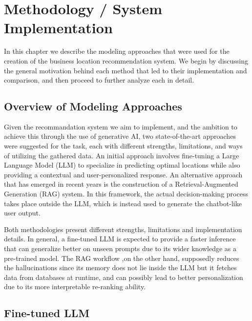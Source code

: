 \chapter{Methodology / System Implementation}
\label{chap4}


In this chapter we describe the modeling approaches that were used for the creation of the business location recommendation system. We begin by discussing the general motivation behind each method that led to their implementation and comparison, and then proceed to further analyze each in detail.


\section{Overview of Modeling Approaches}

Given the recommandation system we aim to implement, and the ambition to achieve this through the use of generative AI, two state-of-the-art approaches were suggested for the task, each with different strengths, limitations, and ways of utilizing the gathered data. An initial approach involves fine-tuning a Large Language Model (LLM) to specialize in predicting optimal locations while also providing a contextual and user-personalized response. An alternative approach that has emerged in recent years is the construction of a Retrieval-Augmented Generation (RAG) system. In this framework, the actual decision-making process takes place outside the LLM, which is instead used to generate the chatbot-like user output.

Both methodologies present different strengths, limitations and implementation details. In general, a fine-tuned LLM is expected to provide a faster inference that can generalize better on unseen prompts due to its wider knowledge as a pre-trained model. The RAG workflow ,on the other hand, supposedly reduces the hallucinations since its memory does not lie inside the LLM but it fetches data from databases at runtime, and can possibly lead to better personalization due to its more interpretable re-ranking ability. 




\section{Fine-tuned LLM}
\label{sec:fine_tuned_llm}

